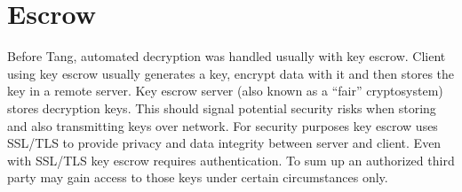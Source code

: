 \documentclass[../xdudla00-porting-Tang-to-Open-WRT.tex]{subfiles}
\begin{document}
\chapter{Escrow}\label{escrow}
Before Tang, automated decryption was handled usually with key escrow.
Client using key escrow usually generates a key, encrypt data with it and then stores the key in a remote server.
Key escrow server (also known as a “fair” cryptosystem) stores decryption keys. This should signal potential security risks when storing and also transmitting keys over network.
For security purposes key escrow uses SSL/TLS to provide privacy and data integrity between server and client.
Even with SSL/TLS key escrow requires authentication.
To sum up an authorized third party may gain access to those keys under certain circumstances only.
\end{document}
